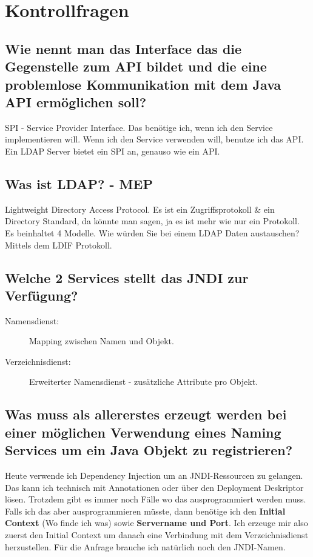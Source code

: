 \section{Kontrollfragen}

\subsection{Wie nennt man das Interface das die Gegenstelle zum API bildet und die eine problemlose Kommunikation mit dem Java API ermöglichen soll?}
SPI - Service Provider Interface. Das benötige ich, wenn ich den Service implementieren will. Wenn ich den Service verwenden will, benutze ich das API. Ein LDAP Server bietet ein SPI an, genauso wie ein API.

\subsection{Was ist LDAP? - MEP}
Lightweight Directory Access Protocol. Es ist ein Zugriffsprotokoll \& ein Directory Standard, da könnte man sagen, ja es ist mehr wie nur ein Protokoll. Es beinhaltet 4 Modelle. Wie würden Sie bei einem LDAP Daten austauschen? Mittels dem LDIF Protokoll.

\subsection{Welche 2 Services stellt das JNDI zur Verfügung?}
\begin{description}
	\item[Namensdienst:] Mapping zwischen Namen und Objekt.
	\item[Verzeichnisdienst:] Erweiterter Namensdienst - zusätzliche Attribute pro Objekt.
\end{description}

\subsection{Was muss als allererstes erzeugt werden bei einer möglichen Verwendung eines Naming Services um ein Java Objekt zu registrieren?}
Heute verwende ich Dependency Injection um an JNDI-Ressourcen zu gelangen. Das kann ich technisch mit Annotationen oder über den Deployment Deskriptor lösen. Trotzdem gibt es immer noch Fälle wo das ausprogrammiert werden muss. Falls ich das aber ausprogrammieren müsste, dann benötige ich den \textbf{Initial Context} (Wo finde ich was) sowie \textbf{Servername und Port}. Ich erzeuge mir also zuerst den Initial Context um danach eine Verbindung mit dem Verzeichnisdienst herzustellen. Für die Anfrage brauche ich natürlich noch den JNDI-Namen.

